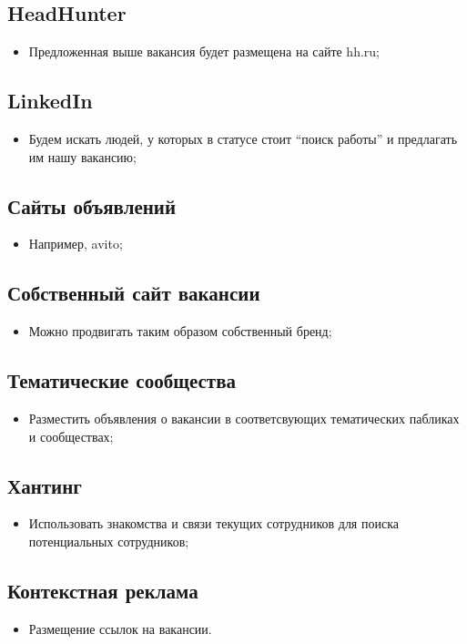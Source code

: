 \documentclass[a4paper,8pt]{article}
\begin{document}
\subsection*{HeadHunter}

    \begin{itemize}
        \item Предложенная выше вакансия будет размещена на сайте hh.ru;
    \end{itemize}

\subsection*{LinkedIn}

    \begin{itemize}
        \item Будем искать людей, у которых в статусе стоит ``поиск работы'' и предлагать им нашу вакансию;
    \end{itemize}

\subsection*{Сайты объявлений}

    \begin{itemize}
        \item Например, avito;
    \end{itemize}

\subsection*{Собственный сайт вакансии}

    \begin{itemize}
        \item Можно продвигать таким образом собственный бренд;
    \end{itemize}

\subsection*{Тематические сообщества}

    \begin{itemize}
        \item Разместить объявления о вакансии в соответсвующих тематических пабликах и сообществах;
    \end{itemize}

\subsection*{Хантинг}

    \begin{itemize}
        \item Использовать знакомства и связи текущих сотрудников для поиска потенциальных сотрудников;
    \end{itemize}

\subsection*{Контекстная реклама}

    \begin{itemize}
        \item Размещение ссылок на вакансии.
    \end{itemize}
\end{document}
